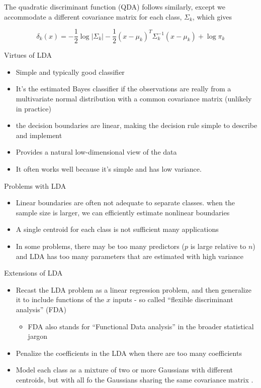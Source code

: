 \documentclass[
]{book}
\providecommand{\tightlist}{%
  \setlength{\itemsep}{0pt}\setlength{\parskip}{0pt}}
\begin{document}
The quadratic discriminant function (QDA) follows similarly, except we accommodate a different covariance matrix for each class, \(\Sigma_k\), which gives

\[
\delta_k(x) = -\frac{1}{2} \log|\Sigma_k| - \frac{1}{2} (x - \mu_k)^T \Sigma_k^{-1} (x- \mu_k) + \log \pi_k
\]

Virtues of LDA

\begin{itemize}
\item
  Simple and typically good classifier
\item
  It's the estimated Bayes classifier if the observations are really from a multivariate normal distribution with a common covariance matrix (unlikely in practice)
\item
  the decision boundaries are linear, making the decision rule simple to describe and implement
\item
  Provides a natural low-dimensional view of the data
\item
  It often works well because it's simple and has low variance.
\end{itemize}

Problems with LDA

\begin{itemize}
\item
  Linear boundaries are often not adequate to separate classes. when the sample size is larger, we can efficiently estimate nonlinear boundaries
\item
  A single centroid for each class is not sufficient many applications
\item
  In some problems, there may be too many predictors (\(p\) is large relative to \(n\)) and LDA has too many parameters that are estimated with high variance
\end{itemize}

Extensions of LDA

\begin{itemize}
\item
  Recast the LDA problem as a linear regression problem, and then generalize it to include functions of the \(x\) inputs - so called ``flexible discriminant analysis'' (FDA)

  \begin{itemize}
  \tightlist
  \item
    FDA also stands for ``Functional Data analysis'' in the broader statistical jargon
  \end{itemize}
\item
  Penalize the coefficients in the LDA when there are too many coefficients
\item
  Model each class as a mixture of two or more Gaussians with different centroids, but with all fo the Gaussians sharing the same covariance matrix .
\end{itemize}
\end{document}
